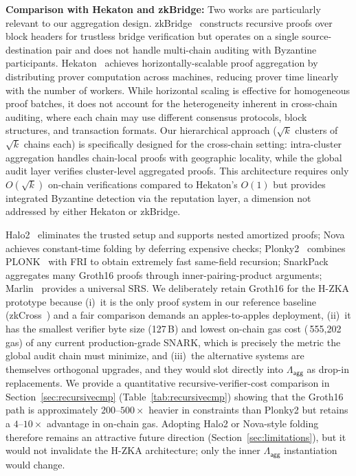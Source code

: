 \documentclass[journal]{IEEEtran}
\newcommand{\aggCircuit}{\Lambda_{\mathsf{agg}}}
\begin{document}
\textbf{Comparison with Hekaton and zkBridge:} Two works are particularly relevant to our aggregation design. zkBridge~\cite{xie2022zkbridge} constructs recursive proofs over block headers for trustless bridge verification but operates on a single source-destination pair and does not handle multi-chain auditing with Byzantine participants. Hekaton~\cite{rosenberg2024hekaton} achieves horizontally-scalable proof aggregation by distributing prover computation across machines, reducing prover time linearly with the number of workers. While horizontal scaling is effective for homogeneous proof batches, it does not account for the heterogeneity inherent in cross-chain auditing, where each chain may use different consensus protocols, block structures, and transaction formats. Our hierarchical approach ($\sqrt{k}$ clusters of $\sqrt{k}$ chains each) is specifically designed for the cross-chain setting: intra-cluster aggregation handles chain-local proofs with geographic locality, while the global audit layer verifies cluster-level aggregated proofs. This architecture requires only $O(\sqrt{k})$ on-chain verifications compared to Hekaton's $O(1)$ but provides integrated Byzantine detection via the reputation layer, a dimension not addressed by either Hekaton or zkBridge.

Halo2~\cite{bowe2019halo} eliminates the trusted setup and supports nested amortized proofs; Nova~\cite{kothapalli2022nova} achieves {constant-time} folding by deferring expensive checks; Plonky2~\cite{plonky2} combines PLONK~\cite{gabizon2019plonk} with FRI to obtain extremely fast same-field recursion; SnarkPack~\cite{bunz2021snarkpack} aggregates many Groth16 proofs through inner-pairing-product arguments; Marlin~\cite{chiesa2020marlin} provides a universal SRS. We deliberately retain Groth16 for the H-ZKA prototype because (i)~it is the only proof system in our reference baseline (zkCross~\cite{guo2024zkcross}) and a fair comparison demands an apples-to-apples deployment, (ii)~it has the smallest verifier byte size (127\,B) and lowest on-chain gas cost (\,555{,}202\,gas) of any current production-grade SNARK, which is precisely the metric the global audit chain must minimize, and (iii)~the alternative systems are themselves orthogonal upgrades, and they would slot directly into $\aggCircuit$ as drop-in replacements. We provide a quantitative recursive-verifier-cost comparison in Section~\ref{sec:recursivecmp} (Table~\ref{tab:recursivecmp}) showing that the Groth16 path is approximately $200$--$500\times$ heavier in constraints than Plonky2 but retains a $4$--$10\times$ advantage in on-chain gas. Adopting Halo2 or Nova-style folding therefore remains an attractive future direction (Section~\ref{sec:limitations}), but it would not invalidate the H-ZKA architecture; only the inner $\aggCircuit$ instantiation would change.
\end{document}
